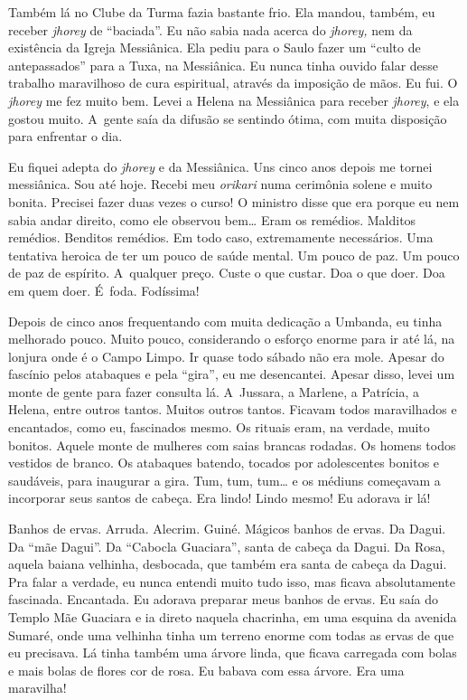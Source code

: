 Também lá no Clube da Turma fazia bastante frio. Ela mandou, também, eu
receber \emph{jhorey} de ``baciada''. Eu não sabia nada acerca do
\emph{jhorey,} nem da existência da Igreja Messiânica. Ela pediu para o
Saulo fazer um ``culto de antepassados'' para a Tuxa, na Messiânica. Eu
nunca tinha ouvido falar desse trabalho maravilhoso de cura espiritual,
através da imposição de mãos. Eu fui. O \emph{jhorey} me fez muito bem.
Levei a Helena na Messiânica para receber \emph{jhorey}, e ela gostou
muito. A~gente saía da difusão se sentindo ótima, com muita disposição
para enfrentar o dia.

Eu fiquei adepta do \emph{jhorey} e da Messiânica. Uns cinco anos depois
me tornei messiânica. Sou até hoje. Recebi meu \emph{orikari} numa
cerimônia solene e muito bonita. Precisei fazer duas vezes o curso! O
ministro disse que era porque eu nem sabia andar direito, como ele
observou bem… Eram os remédios. Malditos remédios. Benditos
remédios. Em todo caso, extremamente necessários. Uma tentativa heroica
de ter um pouco de saúde mental. Um pouco de paz. Um pouco de paz de
espírito. A~qualquer preço. Custe o que custar. Doa o que doer. Doa em
quem doer. É~foda. Fodíssima!

Depois de cinco anos frequentando com muita dedicação a Umbanda, eu
tinha melhorado pouco. Muito pouco, considerando o esforço enorme para
ir até lá, na lonjura onde é o Campo Limpo. Ir quase todo sábado não
era mole. Apesar do fascínio pelos atabaques e pela ``gira'', eu me
desencantei. Apesar disso, levei um monte de gente para fazer consulta
lá. A~Jussara, a Marlene, a Patrícia, a Helena, entre outros tantos.
Muitos outros tantos. Ficavam todos maravilhados e encantados, como eu,
fascinados mesmo. Os rituais eram, na verdade, muito bonitos. Aquele
monte de mulheres com saias brancas rodadas. Os homens todos vestidos de
branco. Os atabaques batendo, tocados por adolescentes bonitos e
saudáveis, para inaugurar a gira. Tum, tum, tum… e os médiuns
começavam a incorporar seus santos de cabeça. Era lindo! Lindo mesmo!
Eu adorava ir lá!

Banhos de ervas. Arruda. Alecrim. Guiné. Mágicos banhos de ervas. Da
Dagui. Da ``mãe Dagui''. Da ``Cabocla Guaciara'', santa de cabeça da
Dagui. Da Rosa, aquela baiana velhinha, desbocada, que também era santa
de cabeça da Dagui. Pra falar a verdade, eu nunca entendi muito tudo
isso, mas ficava absolutamente fascinada. Encantada. Eu adorava preparar
meus banhos de ervas. Eu saía do Templo Mãe Guaciara e ia direto naquela
chacrinha, em uma esquina da avenida Sumaré, onde uma velhinha tinha um
terreno enorme com todas as ervas de que eu precisava. Lá tinha também
uma árvore linda, que ficava carregada com bolas e mais bolas de flores
cor de rosa. Eu babava com essa árvore. Era uma maravilha!

